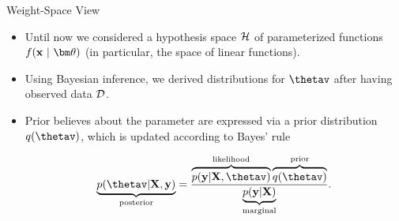 \documentclass[11pt,compress,t,notes=noshow, xcolor=table]{beamer}
\begin{document}


\begin{vbframe}{Weight-Space View}

\begin{itemize}
  \item Until now we considered a hypothesis space $\mathcal{H}$ of parameterized functions $\fxt$ (in particular, the space of linear functions). 
  \item Using Bayesian inference, we derived distributions for $\thetav$ after having observed data $\mathcal{D}$. 
  \item Prior believes about the parameter are expressed via a prior distribution $q(\thetav)$, which is updated according to Bayes' rule 

  $$
  \underbrace{p(\thetav | \Xmat, \yv)}_{\text{posterior}} = \frac{\overbrace{p(\yv | \Xmat, \thetav)}^{\text{likelihood}}\overbrace{q(\thetav)}^{\text{prior}}}{\underbrace{p(\yv|\Xmat)}_{\text{marginal}}}. 
  $$
\end{itemize}

\end{vbframe}
\end{document}
